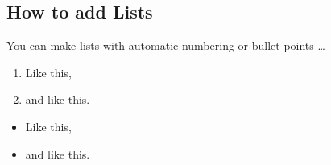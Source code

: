 \documentclass[a4paper]{article}
\begin{document}
\subsection{How to add Lists}

You can make lists with automatic numbering  or bullet points \dots

\begin{enumerate}
\item Like this,
\item and like this.
\end{enumerate}

\begin{itemize}
\item Like this,
\item and like this.
\end{itemize}






%
%
\end{document}
